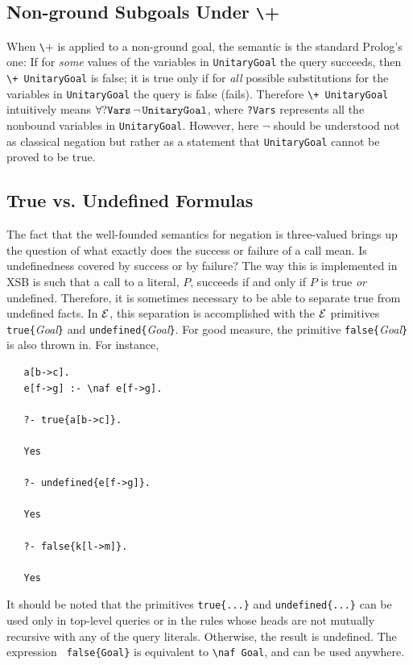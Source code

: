 \documentclass[11pt]{article}
\newcommand{\ERGO}{\mbox{\ensuremath{\cal{E}}\smaller{{\sc{RGO}}}}\xspace}
\newcommand{\FLSYSTEM}{\ERGO}
\newcommand{\bs}{\textbackslash}
\newcommand{\PLGNAF}{\mbox{\texttt{\bs}+}\xspace}
\newcommand{\RULELOGNAF}{{\texttt{{\bs}naf}}\xspace}
\begin{document}
\subsection{Non-ground Subgoals Under \PLGNAF}

When \PLGNAF is applied to a non-ground goal, the semantic is the standard
Prolog's one: If for
\emph{some} values of the variables in {\tt UnitaryGoal} the query succeeds,
then {\tt \PLGNAF\ UnitaryGoal} is false; it is true only if for \emph{all} possible
substitutions for the variables in {\tt UnitaryGoal} the query is false
(fails). Therefore {\tt \PLGNAF\ UnitaryGoal} intuitively means $\tt\forall?Vars\,\neg\,UnitaryGoal$, where {\tt ?Vars} represents all the nonbound variables
in {\tt UnitaryGoal}. However, here $\neg$ should be understood not as classical
negation but rather as a statement that \texttt{UnitaryGoal}  cannot be proved to be true.


\subsection{True vs. Undefined Formulas}

The fact that the well-founded semantics for negation is three-valued
brings up the question of what exactly does the success or failure of a
call mean. Is undefinedness covered by success or by failure?  The way
this is implemented in XSB is such that a call to a literal, $P$, succeeds
if and only if $P$ is true \emph{or} undefined.  Therefore, it is sometimes
necessary to be able to separate true from undefined facts. In \FLSYSTEM, this
separation is accomplished with the \FLSYSTEM primitives
{\tt true\{}\emph{Goal}{\tt \}} and {\tt undefined\{}\emph{Goal}{\tt \}}.
For good measure, the primitive {\tt false\{}\emph{Goal}{\tt \}} is also
thrown in. For instance,
\begin{verbatim}
   a[b->c].
   e[f->g] :- \naf e[f->g].

   ?- true{a[b->c]}.

   Yes

   ?- undefined{e[f->g]}.

   Yes

   ?- false{k[l->m]}.

   Yes
\end{verbatim}
It should be noted that the primitives {\tt true\{...\}}  and
{\tt undefined\{...\}} can be used only in top-level queries or in the
rules whose heads are not mutually recursive with any of the
query literals. Otherwise, the result is undefined. The expression {\tt
  false\{Goal\}} is equivalent to {\tt \RULELOGNAF Goal},  and can be used
anywhere.
\end{document}
